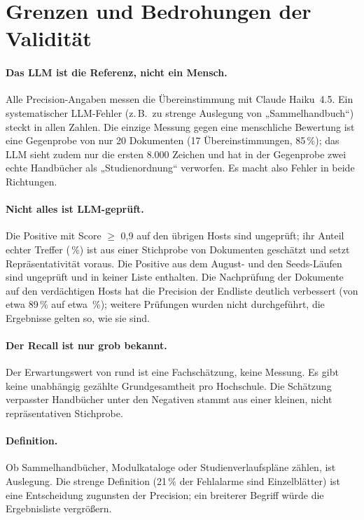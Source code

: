 \section{Grenzen und Bedrohungen der Validität}\label{sec:grenzen}
\paragraph{Das LLM ist die Referenz, nicht ein Mensch.} Alle Precision-Angaben messen die Übereinstimmung mit Claude Haiku~4.5. Ein systematischer LLM-Fehler (z.\,B.\ zu strenge Auslegung von „Sammelhandbuch“) steckt in allen Zahlen. Die einzige Messung gegen eine menschliche Bewertung ist eine Gegenprobe von nur 20 Dokumenten (17 Übereinstimmungen, 85\,\%); das LLM sieht zudem nur die ersten 8.000 Zeichen und hat in der Gegenprobe zwei echte Handbücher als „Studienordnung“ verworfen. Es macht also Fehler in beide Richtungen.

\paragraph{Nicht alles ist LLM-geprüft.} Die \zTfidfHigh{} Positive mit Score $\ge$ 0,9 auf den übrigen Hosts sind ungeprüft; ihr Anteil echter Treffer (\zNonSuspectPct\,\%) ist aus einer Stichprobe von \zNonSuspectN{} Dokumenten geschätzt und setzt Repräsentativität voraus. Die \zTfidfOther{} Positive aus dem August- und den Seeds-Läufen sind ungeprüft und in keiner Liste enthalten. Die Nachprüfung der \zSuspectN{} Dokumente auf den \zSuspectHosts{} verdächtigen Hosts hat die Precision der Endliste deutlich verbessert (von etwa 89\,\% auf etwa \zPrecisionEnd\,\%); weitere Prüfungen wurden nicht durchgeführt, die Ergebnisse gelten so, wie sie sind.

\paragraph{Der Recall ist nur grob bekannt.} Der Erwartungswert von rund \zZielwert{} ist eine Fachschätzung, keine Messung. Es gibt keine unabhängig gezählte Grundgesamtheit pro Hochschule. Die Schätzung verpasster Handbücher unter den Negativen stammt aus einer kleinen, nicht repräsentativen Stichprobe.

\paragraph{Definition.} Ob Sammelhandbücher, Modulkataloge oder Studienverlaufspläne zählen, ist Auslegung. Die strenge Definition (21\,\% der Fehlalarme sind Einzelblätter) ist eine Entscheidung zugunsten der Precision; ein breiterer Begriff würde die Ergebnisliste vergrößern.

